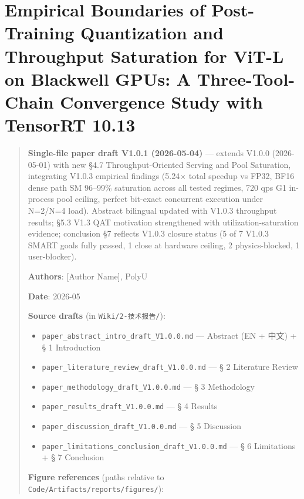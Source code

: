 \documentclass[
]{article}
\author{}
\date{}
\providecommand{\tightlist}{%
  \setlength{\itemsep}{0pt}\setlength{\parskip}{0pt}}
\begin{document}
\section{Empirical Boundaries of Post-Training Quantization and
Throughput Saturation for ViT-L on Blackwell GPUs: A Three-Tool-Chain
Convergence Study with TensorRT
10.13}\label{empirical-boundaries-of-post-training-quantization-and-throughput-saturation-for-vit-l-on-blackwell-gpus-a-three-tool-chain-convergence-study-with-tensorrt-1013}

\begin{quote}
\textbf{Single-file paper draft V1.0.1 (2026-05-04)} --- extends V1.0.0
(2026-05-01) with new §4.7 Throughput-Oriented Serving and Pool
Saturation, integrating V1.0.3 empirical findings (5.24× total speedup
vs FP32, BF16 dense path SM 96--99\% saturation across all tested
regimes, 720 qps G1 in-process pool ceiling, perfect bit-exact
concurrent execution under N=2/N=4 load). Abstract bilingual updated
with V1.0.3 throughput results; §5.3 V1.3 QAT motivation strengthened
with utilization-saturation evidence; conclusion §7 reflects V1.0.3
closure status (5 of 7 V1.0.3 SMART goals fully passed, 1 close at
hardware ceiling, 2 physics-blocked, 1 user-blocker).

\textbf{Authors}: {[}Author Name{]}, PolyU

\textbf{Date}: 2026-05

\textbf{Source drafts} (in \texttt{Wiki/2-技术报告/}):

\begin{itemize}
\tightlist
\item
  \texttt{paper\_abstract\_intro\_draft\_V1.0.0.md} --- Abstract (EN +
  中文) + § 1 Introduction
\item
  \texttt{paper\_literature\_review\_draft\_V1.0.0.md} --- § 2
  Literature Review
\item
  \texttt{paper\_methodology\_draft\_V1.0.0.md} --- § 3 Methodology
\item
  \texttt{paper\_results\_draft\_V1.0.0.md} --- § 4 Results
\item
  \texttt{paper\_discussion\_draft\_V1.0.0.md} --- § 5 Discussion
\item
  \texttt{paper\_limitations\_conclusion\_draft\_V1.0.0.md} --- § 6
  Limitations + § 7 Conclusion
\end{itemize}

\textbf{Figure references} (paths relative to
\texttt{Code/Artifacts/reports/figures/}):


\end{quote}
\end{document}
